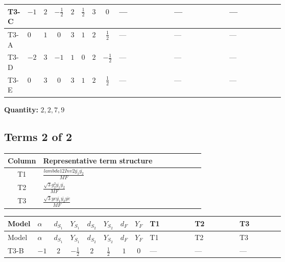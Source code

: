 \documentclass[8pt]{article}
\begin{document}
\begin{landscape}
\begin{longtable}{@{}llcccccc >{\raggedright\arraybackslash}p{0.21\linewidth} >{\raggedright\arraybackslash}p{0.21\linewidth} >{\raggedright\arraybackslash}p{0.21\linewidth}@{}}
\midrule
T3-C & $-1$ & $2$ & $-\frac{1}{2}$ & $2$ & $\frac{1}{2}$ & $3$ & $0$ & --- & --- & --- \\
\midrule
T3-A & $0$ & $1$ & $0$ & $3$ & $1$ & $2$ & $\frac{1}{2}$ & --- & --- & --- \\
\midrule
T3-D & $-2$ & $3$ & $-1$ & $1$ & $0$ & $2$ & $-\frac{1}{2}$ & --- & --- & --- \\
\midrule
T3-E & $0$ & $3$ & $0$ & $3$ & $1$ & $2$ & $\frac{1}{2}$ & --- & --- & --- \\
\midrule
\bottomrule
\end{longtable}
\clearpage
\noindent\textbf{Quantity: }$\mathrm{2,2,7,9}$\par\smallskip
\subsection*{Terms 2 of 2}
\begin{center}
\begin{tabular}{@{}c >{\raggedright\arraybackslash}p{0.82\linewidth}@{}}
\toprule
Column & Representative term structure \\
\midrule
T1 & \(\displaystyle \frac{lambda12Inv2 \overline{y_{1}} \overline{y_{2}}}{MF}\) \\
\midrule
T2 & \(\displaystyle \frac{\sqrt{3} g_{2}^{2} \overline{y_{1}} \overline{y_{2}}}{MF}\) \\
\midrule
T3 & \(\displaystyle \frac{\sqrt{3} ye \overline{y_{1}} \overline{y_{2}} \overline{ye}}{MF}\) \\
\midrule
\bottomrule
\end{tabular}
\end{center}
\smallskip
\tiny
\begin{longtable}{@{}llcccccc >{\raggedright\arraybackslash}p{0.21\linewidth} >{\raggedright\arraybackslash}p{0.21\linewidth} >{\raggedright\arraybackslash}p{0.21\linewidth}@{}}
\toprule
Model & $\alpha$ & $d_{S_1}$ & $Y_{S_1}$ & $d_{S_2}$ & $Y_{S_2}$ & $d_F$ & $Y_F$ & T1 & T2 & T3 \\
\midrule
\endfirsthead
\toprule
Model & $\alpha$ & $d_{S_1}$ & $Y_{S_1}$ & $d_{S_2}$ & $Y_{S_2}$ & $d_F$ & $Y_F$ & T1 & T2 & T3 \\
\midrule
\endhead
T3-B & $-1$ & $2$ & $-\frac{1}{2}$ & $2$ & $\frac{1}{2}$ & $1$ & $0$ & --- & --- & --- \\
\midrule

\end{longtable}
\end{landscape}
\end{document}

